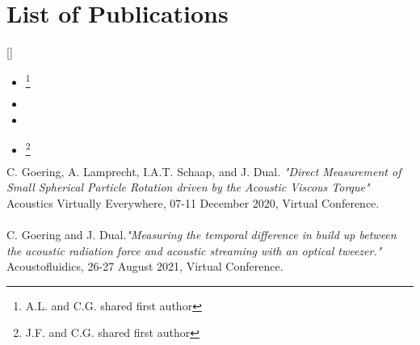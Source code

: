 \chapter*{List of Publications}


\makeatletter
\DeclareCiteCommand{\fullcite}
  {%
    }
  {\usedriver
     {}
     {}}
  {\multicitedelim}
  {}
\DeclareCiteCommand{\footfullcite}[\mkbibfootnote]
  {%
    }
  {\usedriver
     {}
     {}}
  {\multicitedelim}
  {}
\makeatotherts

\begin{itemize}
  \item {}\footnote{A.L. and C.G. shared first author}
  \item {}
  \item {}
  \item {}\footnote{J.F. and C.G. shared first author}
\end{itemize}


C. Goering, A. Lamprecht, I.A.T. Schaap, and J. Dual.  \emph{"Direct 
Measurement of Small Spherical Particle Rotation driven by the Acoustic Viscous 
Torque"} Acoustics Virtually Everywhere, 07-11 December 2020, Virtual 
Conference.\\
  \\
C. Goering and J. Dual.\emph{"Measuring the temporal difference in build up 
between the acoustic radiation force and acoustic streaming with an optical 
tweezer."} Acoustofluidics, 26-27 August 2021, Virtual Conference.\\
